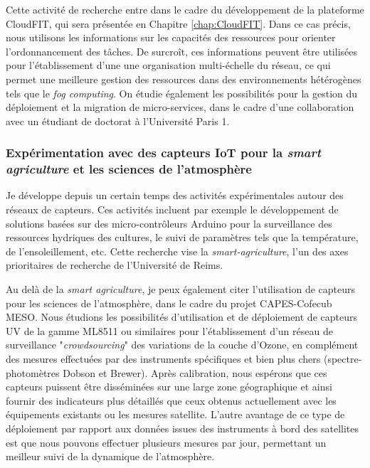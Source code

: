 Cette activité de recherche entre dans le cadre du développement de la plateforme CloudFIT, qui sera présentée en Chapitre \ref{chap:CloudFIT}. Dans ce cas précis, nous utilisons les informations sur les capacités des ressources pour orienter l'ordonnancement des tâches. De surcroît, ces informations peuvent être utilisées pour l'établissement d'une une organisation multi-échelle du réseau, ce qui permet une meilleure gestion des ressources dans des environnements hétérogènes tels que le \textit{fog computing}. On étudie également les possibilités pour la gestion du déploiement et la migration de  micro-services, dans le cadre d'une collaboration avec un étudiant de doctorat à l'Université Paris 1. 


\subsubsection*{Expérimentation avec des capteurs IoT pour la \textit{smart agriculture} et les sciences de l'atmosphère}

Je développe depuis un certain temps des activités expérimentales autour des réseaux de capteurs. Ces activités incluent par exemple le développement de solutions basées sur des micro-contrôleurs Arduino pour la surveillance des ressources hydriques des cultures, le suivi de paramètres tels que la température, de l'ensoleillement, etc. Cette recherche vise la \textit{smart-agriculture}, l'un des axes prioritaires de recherche de l'Université de Reims.

Au delà de la \textit{smart agriculture}, je peux également citer l'utilisation de capteurs pour les sciences de l'atmosphère, dans le cadre du projet CAPES-Cofecub MESO. Nous étudions les possibilités d'utilisation et de déploiement de capteurs UV de la gamme ML8511 ou similaires pour l'établissement d'un réseau de surveillance "\textit{crowdsourcing}" des variations de la couche d'Ozone, en complément des mesures effectuées par des instruments spécifiques et bien plus chers (spectre-photomètres Dobson et Brewer). Après calibration, nous espérons que ces capteurs puissent être disséminées sur une large zone géographique et ainsi fournir des indicateurs plus détaillés que ceux obtenus actuellement avec les équipements existants ou les mesures satellite. L'autre avantage de ce type de déploiement par rapport aux données issues des instruments à bord des satellites est que nous pouvons effectuer plusieurs mesures par jour, permettant un meilleur suivi de la dynamique de l'atmosphère.

